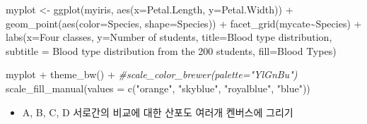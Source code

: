 \documentclass[
]{book}
\newenvironment{Shaded}{\begin{snugshade}}{\end{snugshade}}
\newcommand{\AttributeTok}[1]{\textcolor[rgb]{0.77,0.63,0.00}{#1}}
\newcommand{\CommentTok}[1]{\textcolor[rgb]{0.56,0.35,0.01}{\textit{#1}}}
\newcommand{\FunctionTok}[1]{\textcolor[rgb]{0.00,0.00,0.00}{#1}}
\newcommand{\NormalTok}[1]{#1}
\newcommand{\OtherTok}[1]{\textcolor[rgb]{0.56,0.35,0.01}{#1}}
\newcommand{\SpecialCharTok}[1]{\textcolor[rgb]{0.00,0.00,0.00}{#1}}
\newcommand{\StringTok}[1]{\textcolor[rgb]{0.31,0.60,0.02}{#1}}
\providecommand{\tightlist}{%
  \setlength{\itemsep}{0pt}\setlength{\parskip}{0pt}}
\begin{document}
\begin{Shaded}
\begin{Highlighting}[]
\NormalTok{myplot }\OtherTok{\textless{}{-}} \FunctionTok{ggplot}\NormalTok{(myiris, }\FunctionTok{aes}\NormalTok{(}\AttributeTok{x=}\NormalTok{Petal.Length, }\AttributeTok{y=}\NormalTok{Petal.Width)) }\SpecialCharTok{+} 
  \FunctionTok{geom\_point}\NormalTok{(}\FunctionTok{aes}\NormalTok{(}\AttributeTok{color=}\NormalTok{Species, }\AttributeTok{shape=}\NormalTok{Species)) }\SpecialCharTok{+}
  \FunctionTok{facet\_grid}\NormalTok{(mycate}\SpecialCharTok{\textasciitilde{}}\NormalTok{Species) }\SpecialCharTok{+}
  \FunctionTok{labs}\NormalTok{(}\AttributeTok{x=}\StringTok{\textquotesingle{}Four classes\textquotesingle{}}\NormalTok{,}
       \AttributeTok{y=}\StringTok{\textquotesingle{}Number of students\textquotesingle{}}\NormalTok{,}
       \AttributeTok{title=}\StringTok{\textquotesingle{}Blood type distribution\textquotesingle{}}\NormalTok{,}
       \AttributeTok{subtitle =} \StringTok{\textquotesingle{}Blood type distribution from the 200 students\textquotesingle{}}\NormalTok{,}
       \AttributeTok{fill=}\StringTok{\textquotesingle{}Blood Types\textquotesingle{}}\NormalTok{) }

\NormalTok{myplot }\SpecialCharTok{+} 
  \FunctionTok{theme\_bw}\NormalTok{() }\SpecialCharTok{+}
  \CommentTok{\#scale\_color\_brewer(palette="YlGnBu")}
  \FunctionTok{scale\_fill\_manual}\NormalTok{(}\AttributeTok{values =} \FunctionTok{c}\NormalTok{(}\StringTok{"orange"}\NormalTok{, }\StringTok{"skyblue"}\NormalTok{, }\StringTok{"royalblue"}\NormalTok{, }\StringTok{"blue"}\NormalTok{))}
\end{Highlighting}
\end{Shaded}

\begin{itemize}
\tightlist
\item
  A, B, C, D 서로간의 비교에 대한 산포도 여러개 켄버스에 그리기
\end{itemize}
\end{document}
